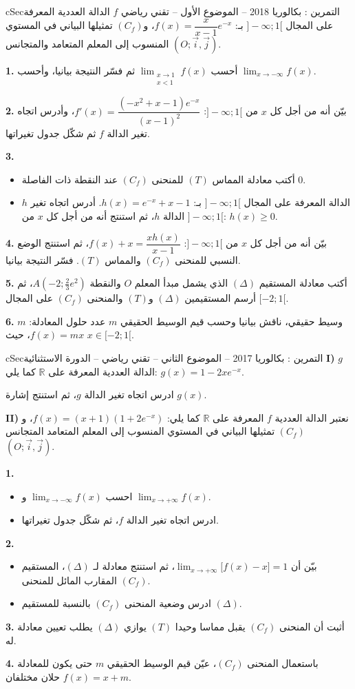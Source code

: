 \documentclass[12pt,a4paper]{article}
\newenvironment{BOX}[2]{\begin{otherlanguage}{english}\begin{arbox}{#1}{#2}}{\end{arbox}\end{otherlanguage}}
\newcounter{exo}
\newenvironment{tamrin}[1]{\stepcounter{exo}\begin{BOX}{cSec}{التمرين \theexo: #1}}{\end{BOX}}
\newcommand{\R}{\mathbb{R}}
\newenvironment{sq}{\begin{itemize}[leftmargin=2.4em,itemsep=3pt]}{\end{itemize}}
\newcommand{\qa}{\item[(أ)]}\newcommand{\qb}{\item[(ب)]}\newcommand{\qc}{\item[(جـ)]}\newcommand{\qd}{\item[(د)]}\newcommand{\qe}{\item[(هـ)]}
\newcommand{\QQ}[1]{\par\smallskip\textbf{#1.} }
\begin{document}
\begin{tamrin}{بكالوريا 2018 -- الموضوع الأول -- تقني رياضي}
$f$ الدالة العددية المعرفة على المجال $]{-}\infty;1[$ بـ: $f(x)=\dfrac{x}{x-1}e^{-x}$، و$(C_f)$ تمثيلها البياني في المستوي المنسوب إلى المعلم المتعامد والمتجانس $(O;\vec{i},\vec{j})$.
\QQ{1} أحسب $\displaystyle\lim_{\substack{x\to1\\x<1}}f(x)$ ثم فسّر النتيجة بيانيا، وأحسب $\displaystyle\lim_{x\to-\infty}f(x)$.
\QQ{2} بيّن أنه من أجل كل $x$ من $]{-}\infty;1[$: $f'(x)=\dfrac{\left(-x^2+x-1\right)e^{-x}}{(x-1)^2}$، وأدرس اتجاه تغير الدالة $f$ ثم شكّل جدول تغيراتها.
\QQ{3}
\begin{sq}
\qa أكتب معادلة المماس $(T)$ للمنحنى $(C_f)$ عند النقطة ذات الفاصلة $0$.
\qb $h$ الدالة المعرفة على المجال $]{-}\infty;1[$ بـ: $h(x)=e^{-x}+x-1$. أدرس اتجاه تغير الدالة $h$، ثم استنتج أنه من أجل كل $x$ من $]{-}\infty;1[$: $h(x)\geqslant0$.
\end{sq}
\QQ{4} بيّن أنه من أجل كل $x$ من $]{-}\infty;1[$: $f(x)+x=\dfrac{xh(x)}{x-1}$، ثم استنتج الوضع النسبي للمنحنى $(C_f)$ والمماس $(T)$. فسّر النتيجة بيانيا.
\QQ{5} أكتب معادلة المستقيم $(\Delta)$ الذي يشمل مبدأ المعلم $O$ والنقطة $A\left(-2;\frac23e^2\right)$، ثم أرسم المستقيمين $(\Delta)$ و$(T)$ والمنحنى $(C_f)$ على المجال $[-2;1[$.
\QQ{6} $m$ وسيط حقيقي، ناقش بيانيا وحسب قيم الوسيط الحقيقي $m$ عدد حلول المعادلة: $f(x)=mx$، حيث $x\in[-2;1[$.
\end{tamrin}

\begin{tamrin}{بكالوريا 2017 -- الموضوع الثاني -- تقني رياضي -- الدورة الاستثنائية}
\textbf{I)} $g$ الدالة العددية المعرفة على $\R$ كما يلي: $g(x)=1-2xe^{-x}$.
\par ادرس اتجاه تغير الدالة $g$، ثم استنتج إشارة $g(x)$.

\textbf{II)} نعتبر الدالة العددية $f$ المعرفة على $\R$ كما يلي: $f(x)=(x+1)\left(1+2e^{-x}\right)$،
و $(C_f)$ تمثيلها البياني في المستوي المنسوب إلى المعلم المتعامد المتجانس $(O;\vec i,\vec j)$.
\QQ{1}
\begin{sq}
\qa احسب $\displaystyle\lim_{x\to-\infty}f(x)$ و $\displaystyle\lim_{x\to+\infty}f(x)$.
\qb ادرس اتجاه تغير الدالة $f$، ثم شكّل جدول تغيراتها.
\end{sq}
\QQ{2}
\begin{sq}
\qa بيّن أن $\displaystyle\lim_{x\to+\infty}\big[f(x)-x\big]=1$، ثم استنتج معادلة لـ $(\Delta)$، المستقيم المقارب المائل للمنحنى $(C_f)$.
\qb ادرس وضعية المنحنى $(C_f)$ بالنسبة للمستقيم $(\Delta)$.
\end{sq}
\QQ{3} أثبت أن المنحنى $(C_f)$ يقبل مماسا وحيدا $(T)$ يوازي $(\Delta)$ يطلب تعيين معادلة له.
\QQ{4} باستعمال المنحنى $(C_f)$، عيّن قيم الوسيط الحقيقي $m$ حتى يكون للمعادلة $f(x)=x+m$ حلان مختلفان.
\end{tamrin}
\end{document}
